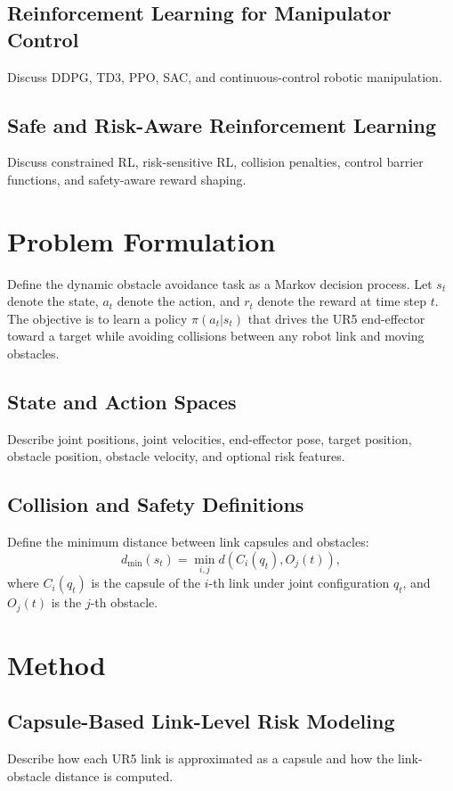 \documentclass{ieeeaccess}
\begin{document}
\subsection{Reinforcement Learning for Manipulator Control}
Discuss DDPG, TD3, PPO, SAC, and continuous-control robotic manipulation.

\subsection{Safe and Risk-Aware Reinforcement Learning}
Discuss constrained RL, risk-sensitive RL, collision penalties, control barrier functions, and safety-aware reward shaping.

\section{Problem Formulation}
\label{sec:problem}

Define the dynamic obstacle avoidance task as a Markov decision process.
Let $s_t$ denote the state, $a_t$ denote the action, and $r_t$ denote the reward at time step $t$.
The objective is to learn a policy $\pi(a_t|s_t)$ that drives the UR5 end-effector toward a target while avoiding collisions between any robot link and moving obstacles.

\subsection{State and Action Spaces}
Describe joint positions, joint velocities, end-effector pose, target position, obstacle position, obstacle velocity, and optional risk features.

\subsection{Collision and Safety Definitions}
Define the minimum distance between link capsules and obstacles:
\begin{equation}
    d_{\min}(s_t) = \min_{i,j} d(C_i(q_t), O_j(t)),
\end{equation}
where $C_i(q_t)$ is the capsule of the $i$-th link under joint configuration $q_t$, and $O_j(t)$ is the $j$-th obstacle.

\section{Method}
\label{sec:method}

\subsection{Capsule-Based Link-Level Risk Modeling}
Describe how each UR5 link is approximated as a capsule and how the link-obstacle distance is computed.
\end{document}
